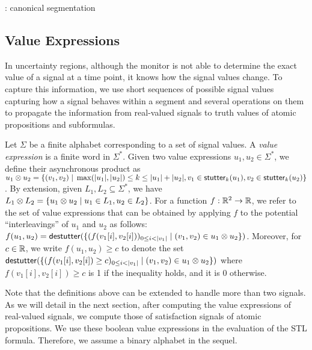 \begin{example}
	\TODO: canonical segmentation
\end{example}

\subsection{Value Expressions}
In uncertainty regions, although the monitor is not able to determine the exact value of a signal at a time point, it knows how the signal values change.
To capture this information, we use short sequences of possible signal values capturing how a signal behaves within a segment and several operations on them to propagate the information from real-valued signals to truth values of atomic propositions and subformulas.


Let $\Sigma$ be a finite alphabet corresponding to a set of signal values.
A \emph{value expression} is a finite word in $\Sigma^*$.
Given two value expressions $u_1, u_2 \in \Sigma^*$, we define their asynchronous product as $u_1 \otimes u_2 = \{ (v_1,v_2) \st \max(|u_1|, |u_2|) \leq k \leq |u_1| + |u_2|, v_1 \in \stutter_k(u_1), v_2 \in \stutter_k(u_2) \}$.
By extension, given $L_1, L_2 \subseteq \Sigma^*$, we have $L_1 \otimes L_2 = \{ u_1 \otimes u_2 \st u_1 \in L_1, u_2 \in L_2 \}$.
For a function $f : \mathbb{R}^2 \to \mathbb{R}$, we refer to the set of value expressions that can be obtained by applying $f$ to the potential ``interleavings'' of $u_1$ and $u_2$ as follows: $f(u_1, u_2) = \destutter(\{(f(v_1[i], v_2[i]))_{0 \leq i < |v_1|} \st (v_1, v_2) \in u_1 \otimes u_2\})$.
Moreover, for $c \in \mathbb{R}$, we write $f(u_1, u_2) \geq c$ to denote the set $\destutter(\{(f(v_1[i], v_2[i]) \geq c)_{0 \leq i < |v_1|} \st (v_1, v_2) \in u_1 \otimes u_2\})$ where $f(v_1[i], v_2[i]) \geq c$ is 1 if the inequality holds, and it is 0 otherwise.

Note that the definitions above can be extended to handle more than two signals.
As we will detail in the next section, after computing the value expressions of real-valued signals, we compute those of satisfaction signals of atomic propositions.
We use these boolean value expressions in the evaluation of the STL formula.
Therefore, we assume a binary alphabet in the sequel.

